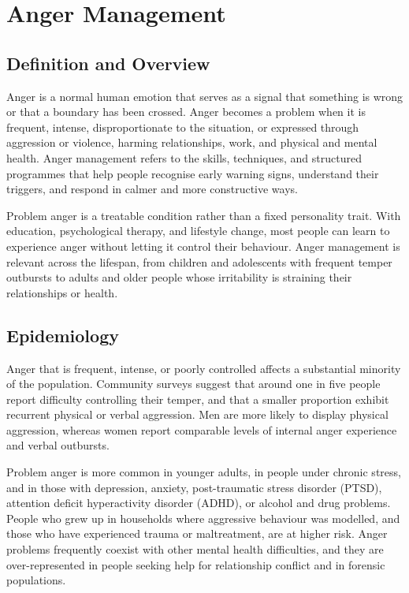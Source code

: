\chapter{Anger Management}

\section*{Definition and Overview}
Anger is a normal human emotion that serves as a signal that something is wrong or that a boundary has been crossed. Anger becomes a problem when it is frequent, intense, disproportionate to the situation, or expressed through aggression or violence, harming relationships, work, and physical and mental health. Anger management refers to the skills, techniques, and structured programmes that help people recognise early warning signs, understand their triggers, and respond in calmer and more constructive ways.

Problem anger is a treatable condition rather than a fixed personality trait. With education, psychological therapy, and lifestyle change, most people can learn to experience anger without letting it control their behaviour. Anger management is relevant across the lifespan, from children and adolescents with frequent temper outbursts to adults and older people whose irritability is straining their relationships or health.

\section*{Epidemiology}
Anger that is frequent, intense, or poorly controlled affects a substantial minority of the population. Community surveys suggest that around one in five people report difficulty controlling their temper, and that a smaller proportion exhibit recurrent physical or verbal aggression. Men are more likely to display physical aggression, whereas women report comparable levels of internal anger experience and verbal outbursts.

Problem anger is more common in younger adults, in people under chronic stress, and in those with depression, anxiety, post-traumatic stress disorder (PTSD), attention deficit hyperactivity disorder (ADHD), or alcohol and drug problems. People who grew up in households where aggressive behaviour was modelled, and those who have experienced trauma or maltreatment, are at higher risk. Anger problems frequently coexist with other mental health difficulties, and they are over-represented in people seeking help for relationship conflict and in forensic populations.

